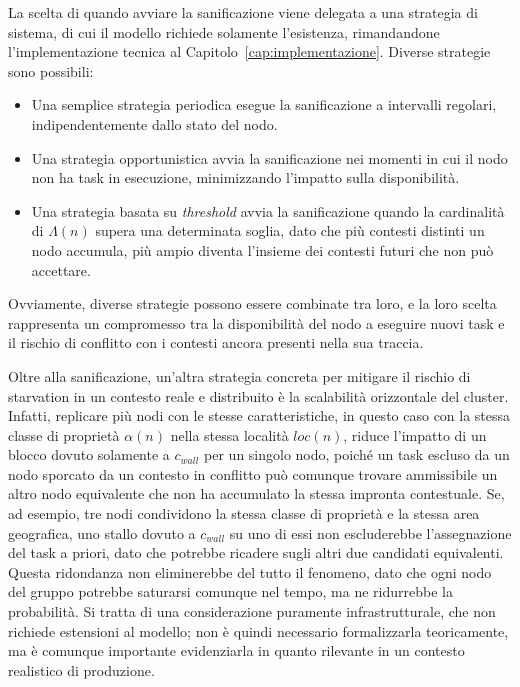 La scelta di quando avviare la sanificazione viene delegata a una strategia di sistema, di cui il modello richiede solamente l'esistenza, rimandandone l'implementazione tecnica al Capitolo~\ref{cap:implementazione}. Diverse strategie sono possibili: 
\begin{itemize}
    \item Una semplice strategia periodica esegue la sanificazione a intervalli regolari, indipendentemente dallo stato del nodo.
    \item Una strategia opportunistica avvia la sanificazione nei momenti in cui il nodo non ha task in esecuzione, minimizzando l'impatto sulla disponibilità.
    \item Una strategia basata su \emph{threshold} avvia la sanificazione quando la cardinalità di $\Lambda(n)$ supera una determinata soglia, dato che più contesti distinti un nodo accumula, più ampio diventa l'insieme dei contesti futuri che non può accettare.
\end{itemize}
Ovviamente, diverse strategie possono essere combinate tra loro, e la loro scelta rappresenta un compromesso tra la disponibilità del nodo a eseguire nuovi task e il rischio di conflitto con i contesti ancora presenti nella sua traccia.

Oltre alla sanificazione, un'altra strategia concreta per mitigare il rischio di starvation in un contesto reale e distribuito è la scalabilità orizzontale del cluster. Infatti, replicare più nodi con le stesse caratteristiche, in questo caso con la stessa classe di proprietà $\alpha(n)$ nella stessa località $loc(n)$, riduce l'impatto di un blocco dovuto solamente a $c_{wall}$ per un singolo nodo, poiché un task escluso da un nodo sporcato da un contesto in conflitto può comunque trovare ammissibile un altro nodo equivalente che non ha accumulato la stessa impronta contestuale. Se, ad esempio, tre nodi condividono la stessa classe di proprietà e la stessa area geografica, uno stallo dovuto a $c_{wall}$ su uno di essi non escluderebbe l'assegnazione del task a priori, dato che potrebbe ricadere sugli altri due candidati equivalenti. Questa ridondanza non eliminerebbe del tutto il fenomeno, dato che ogni nodo del gruppo potrebbe saturarsi comunque nel tempo, ma ne ridurrebbe la probabilità. Si tratta di una considerazione puramente infrastrutturale, che non richiede estensioni al modello; non è quindi necessario formalizzarla teoricamente, ma è comunque importante evidenziarla in quanto rilevante in un contesto realistico di produzione.


